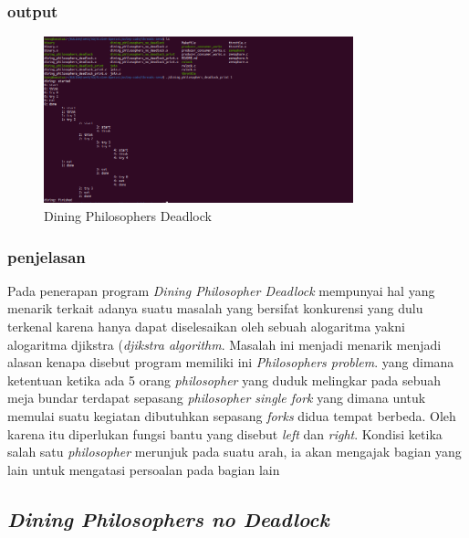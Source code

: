 \documentclass[11pt,a4paper]{article}
\begin{document}
\subsubsection*{output}
\begin{figure}[h]
	\centering
	\includegraphics[width=0.8\textwidth]{Figure/testing/Percobaan-deadlock.png}
	\caption{Dining Philosophers Deadlock}
\end{figure}

\subsubsection{penjelasan}
Pada penerapan program \textit{Dining Philosopher Deadlock} mempunyai hal yang menarik terkait adanya suatu masalah yang bersifat konkurensi yang dulu terkenal karena hanya dapat diselesaikan oleh sebuah alogaritma yakni alogaritma djikstra (\textit{djikstra algorithm}. Masalah ini menjadi menarik menjadi alasan kenapa disebut program memiliki ini \textit{Philosophers problem}. yang dimana ketentuan ketika ada 5 orang \textit{philosopher} yang duduk melingkar pada sebuah meja bundar terdapat sepasang \textit{philosopher single fork} yang dimana untuk memulai suatu kegiatan dibutuhkan sepasang \textit{forks} didua tempat berbeda. Oleh karena itu diperlukan fungsi bantu yang disebut \textit{left} dan \textit{right}. Kondisi ketika salah satu \textit{philosopher} merunjuk pada suatu arah, ia akan mengajak bagian yang lain untuk mengatasi persoalan pada bagian lain 

\subsection {\textit{Dining Philosophers no Deadlock}}
\end{document}
